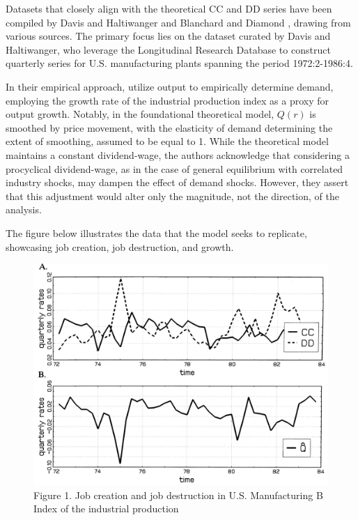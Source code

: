 \documentclass[12pt]{article}
\begin{document}
Datasets that closely align with the theoretical CC and DD series have been compiled by Davis and Haltiwanger
\cite{DAvHalt90,DavHalt92} and Blanchard and Diamond \cite{BlaDia90}, drawing from various sources. The primary focus
lies on the dataset curated by Davis and Haltiwanger, who leverage the Longitudinal Research Database to construct
quarterly series for U.S. manufacturing plants spanning the period 1972:2-1986:4. 

In their empirical approach, \cite{DavHal94}utilize output to empirically determine demand, employing the growth
rate of the industrial production index as a proxy for output growth. Notably, in the foundational theoretical model,
\(Q(r)\) is smoothed by price movement, with the elasticity of demand determining the extent of smoothing, assumed to be
equal to 1. While the theoretical model maintains a constant dividend-wage, the authors acknowledge that considering
a procyclical dividend-wage, as in the case of general equilibrium with correlated industry shocks, may dampen the
effect of demand shocks. However, they assert that this adjustment would alter only the magnitude, not the direction, of
the analysis. 

The figure below illustrates the data that the model seeks to replicate, showcasing job creation, job destruction, and growth.

\begin{figure}
    \centering
    \includegraphics[scale = 0.4]{Plot2.2.png}
    \caption{Figure 1. Job creation and job destruction in U.S. Manufacturing B Index of the industrial production}
    \label{plot:2.2}
\end{figure}
\end{document}
